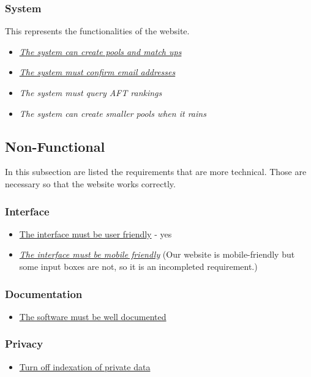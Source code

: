 \documentclass[a4paper, 12pt]{article}
\begin{document}
\subsubsection*{System}   
     This represents the functionalities of the website.
    \begin{itemize}
    	\item \underline{\textit{The system can create pools and match ups}}
		\item \underline{\textit{The system must confirm email addresses}}
		\item \textit{The system must query AFT rankings}
		\item \textit{The system can create smaller pools when it rains}
    \end{itemize}
    
\subsection*{Non-Functional}
In this subsection are listed the requirements that are more technical. Those are necessary so that the website works correctly. 

\subsubsection*{Interface}
	
	\begin{itemize}
		\item \underline{The interface must be user friendly} - yes
		\item \underline{\textit{The interface must be mobile friendly}} (Our website is mobile-friendly but some input boxes are not, so it is an incompleted requirement.)
	\end{itemize}

\subsubsection*{Documentation}
	
	\begin{itemize}
		\item \underline{The software must be well documented}
	\end{itemize}
	
\subsubsection*{Privacy}
    
    \begin{itemize}
    	\item \underline{Turn off indexation of private data}
    \end{itemize}
\end{document}
